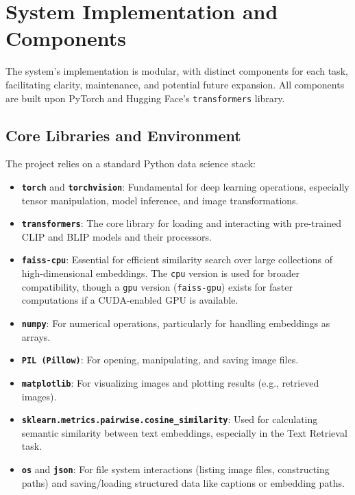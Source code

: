 \documentclass{article}
\begin{document}
\section{System Implementation and Components}
\label{sec:implementation}


The system's implementation is modular, with distinct components for each task, facilitating clarity, maintenance, and potential future expansion. All components are built upon PyTorch and Hugging Face's \texttt{transformers} library.

\subsection{Core Libraries and Environment}
The project relies on a standard Python data science stack:
\begin{itemize}
    \item \textbf{\texttt{torch}} and \textbf{\texttt{torchvision}}: Fundamental for deep learning operations, especially tensor manipulation, model inference, and image transformations.
    \item \textbf{\texttt{transformers}}: The core library for loading and interacting with pre-trained CLIP and BLIP models and their processors.
    \item \textbf{\texttt{faiss-cpu}}: Essential for efficient similarity search over large collections of high-dimensional embeddings. The \texttt{cpu} version is used for broader compatibility, though a \texttt{gpu} version (\texttt{faiss-gpu}) exists for faster computations if a CUDA-enabled GPU is available.
    \item \textbf{\texttt{numpy}}: For numerical operations, particularly for handling embeddings as arrays.
    \item \textbf{\texttt{PIL (Pillow)}}: For opening, manipulating, and saving image files.
    \item \textbf{\texttt{matplotlib}}: For visualizing images and plotting results (e.g., retrieved images).
    \item \textbf{\texttt{sklearn.metrics.pairwise.cosine\_similarity}}: Used for calculating semantic similarity between text embeddings, especially in the Text Retrieval task.
    \item \textbf{\texttt{os}} and \textbf{\texttt{json}}: For file system interactions (listing image files, constructing paths) and saving/loading structured data like captions or embedding paths.
\end{itemize}
\end{document}
